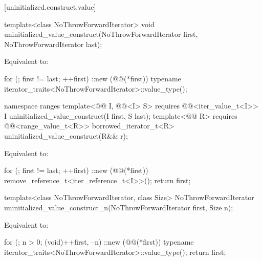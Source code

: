 [uninitialized.construct.value]{}

%
\begin{itemdecl}
template<class NoThrowForwardIterator>
  void uninitialized_value_construct(NoThrowForwardIterator first, NoThrowForwardIterator last);
\end{itemdecl}

\begin{itemdescr}
\pnum
\effects
Equivalent to:
\begin{codeblock}
for (; first != last; ++first)
  ::new (@@(*first))
    typename iterator_traits<NoThrowForwardIterator>::value_type();
\end{codeblock}
\end{itemdescr}

%
\begin{itemdecl}
namespace ranges {
  template<@@ I, @@<I> S>
    requires @@<iter_value_t<I>>
    I uninitialized_value_construct(I first, S last);
  template<@@ R>
    requires @@<range_value_t<R>>
    borrowed_iterator_t<R> uninitialized_value_construct(R&& r);
}
\end{itemdecl}

\begin{itemdescr}
\pnum
\effects
Equivalent to:
\begin{codeblock}
for (; first != last; ++first)
  ::new (@@(*first)) remove_reference_t<iter_reference_t<I>>();
return first;
\end{codeblock}
\end{itemdescr}

%
\begin{itemdecl}
template<class NoThrowForwardIterator, class Size>
  NoThrowForwardIterator uninitialized_value_construct_n(NoThrowForwardIterator first, Size n);
\end{itemdecl}

\begin{itemdescr}
\pnum
\effects
Equivalent to:
\begin{codeblock}
for (; n > 0; (void)++first, --n)
  ::new (@@(*first))
    typename iterator_traits<NoThrowForwardIterator>::value_type();
return first;
\end{codeblock}
\end{itemdescr}

